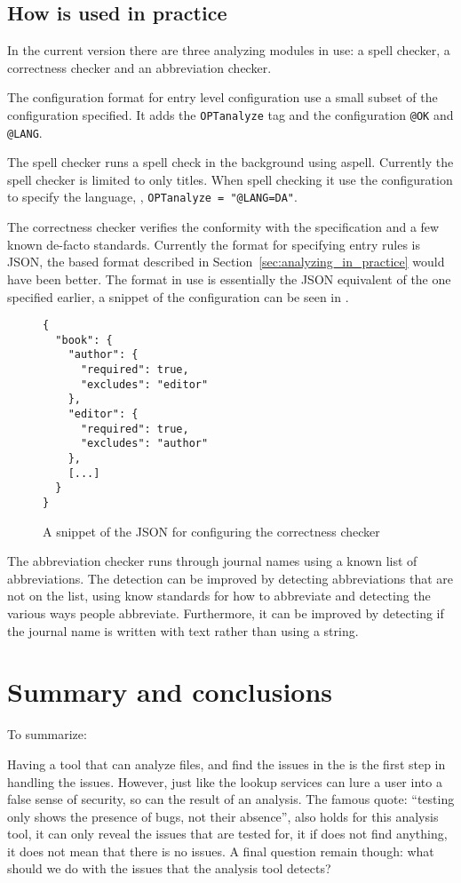 \subsection{How {\orangutan} is used in practice}

In the current version there are three analyzing modules in use: a
spell checker, a correctness checker and an abbreviation checker.

The configuration format for entry level configuration use a small
subset of the configuration specified.  It adds the
\texttt{OPTanalyze} tag and the configuration \texttt{@OK} and
\texttt{@LANG}.

The spell checker runs a spell check in the background using aspell.
Currently the spell checker is limited to only titles.  When spell
checking it use the configuration to specify the language, \eg,
\texttt{OPTanalyze = "@LANG=DA"}.

The correctness checker verifies the conformity with the {\bibtex}
specification and a few known de-facto standards.  Currently the
format for specifying entry rules is JSON, the {\bibtex} based format
described in Section~\ref{sec:analyzing_in_practice} would have been
better.  The format in use is essentially the JSON equivalent of the
one specified earlier, a snippet of the configuration can be seen in
.

\begin{figure}
  \centering
\begin{verbatim}
{
  "book": {
    "author": {
      "required": true,
      "excludes": "editor"
    },
    "editor": {
      "required": true,
      "excludes": "author"
    },
    [...]
  }
}
\end{verbatim}
\caption{A snippet of the JSON for configuring the correctness checker}
\label{fig:correctness_checker_json}
\end{figure}


The abbreviation checker runs through journal names using a known list
of abbreviations.  The detection can be improved by detecting
abbreviations that are not on the list, using know standards for how
to abbreviate and detecting the various ways people abbreviate.
Furthermore, it can be improved by detecting if the journal name is
written with text rather than using a {\bibtex} string.


\section{Summary and conclusions}

To summarize:

Having a tool that can analyze {\bibtex} files, and find the issues in
the  is the first step in handling the issues.  However,
just like the lookup services can lure a user into a false sense of
security, so can the result of an analysis.  The famous quote:
``testing only shows the presence of bugs, not their absence'', also
holds for this analysis tool, it can only reveal the issues that are
tested for, it if does not find anything, it does not mean that there
is no issues.  A final question remain though: what should we do with
the issues that the analysis tool detects?
